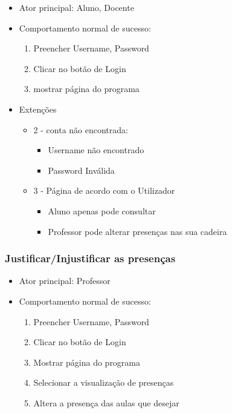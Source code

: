 \documentclass[11pt]{article}   %
\begin{document}
\begin{itemize}
    \item Ator principal: Aluno, Docente
    \item Comportamento normal de sucesso:
    \begin{enumerate}
        \item Preencher Username, Password
        \item Clicar no botão de Login
        \item mostrar página do programa
    \end{enumerate}
    \item Extenções
    \begin{itemize}
        \item 2 - conta não encontrada:
        \begin{itemize}
            \item Username não encontrado
            \item Password Inválida
        \end{itemize}
        \item 3 - Página de acordo com o Utilizador
        \begin{itemize}
            \item Aluno apenas pode consultar
            \item Professor pode alterar presenças nas sua cadeira
        \end{itemize}
    \end{itemize}
\end{itemize}


\subsubsection{Justificar/Injustificar as presenças} 

\begin{itemize}
    \item Ator principal: Professor
    \item Comportamento normal de sucesso:
    \begin{enumerate}
        \item Preencher Username, Password
        \item Clicar no botão de Login
        \item Mostrar página do programa
        \item Selecionar a visualização de presenças
        \item Altera a presença das aulas que desejar
    \end{enumerate}
    
\end{itemize}
\end{document}
